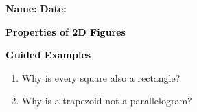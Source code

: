 \documentclass[12pt, letterpaper, fleqn]{article}
\begin{document}
\textbf{Name:} \underline{\hspace{5cm}}
\hfill
\textbf{Date:} \underline{\hspace{3cm}}\\

\begin{tcolorbox}[colback=customteal!20]
    \large\textcolor{black}{\textbf{Properties of 2D Figures}}
\end{tcolorbox}
\newpage
\begin{tcolorbox}[colback=customteal!20]
    \large\textcolor{black}{\textbf{Guided Examples}}
\end{tcolorbox}
\begin{enumerate}[itemsep=3.5cm, leftmargin=0.6cm]
\item Why is every square also a rectangle?
\vspace{3cm}
\item Why is a trapezoid not a parallelogram?
\end{enumerate}
\end{document}
